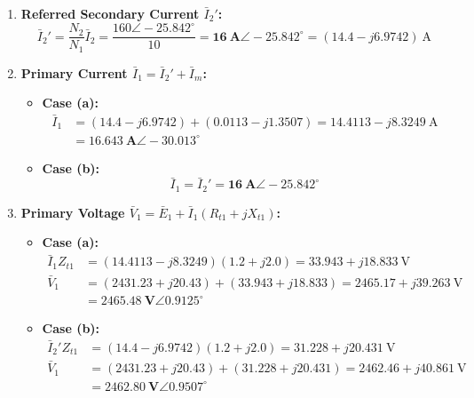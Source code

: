 \begin{enumerate}
    \item \textbf{Referred Secondary Current $\bar{I}_2'$:}
    \begin{equation}
        \bar{I}_2' = \frac{N_2}{N_1} \bar{I}_2 = \frac{160\angle -25.842^\circ}{10} = \mathbf{16\ \text{A} \angle -25.842^\circ} = (14.4 - j6.9742)\ \text{A}
    \end{equation}

    \item \textbf{Primary Current $\bar{I}_1 = \bar{I}_2' + \bar{I}_m$:}
    \begin{itemize}
        \item \textbf{Case (a):}
        \begin{align}
            \bar{I}_1 &= (14.4 - j6.9742) + (0.0113 - j1.3507) = 14.4113 - j8.3249\ \text{A} \nonumber\\
                      &= \mathbf{16.643\ \text{A} \angle -30.013^\circ}
        \end{align}
        \item \textbf{Case (b):}
        \begin{equation}
            \bar{I}_1 = \bar{I}_2' = \mathbf{16\ \text{A} \angle -25.842^\circ}
        \end{equation}
    \end{itemize}

    \item \textbf{Primary Voltage $\bar{V}_1 = \bar{E}_1 + \bar{I}_1 (R_{t1} + jX_{t1})$:}
    \begin{itemize}
        \item \textbf{Case (a):}
        \begin{align}
            \bar{I}_1 Z_{t1} &= (14.4113 - j8.3249)(1.2 + j2.0) = 33.943 + j18.833\ \text{V} \nonumber\\
            \bar{V}_1 &= (2431.23 + j20.43) + (33.943 + j18.833) = 2465.17 + j39.263\ \text{V} \nonumber\\
                      &= \boxed{\mathbf{2465.48\ \text{V} \angle 0.9125^\circ}}
        \end{align}
        \item \textbf{Case (b):}
        \begin{align}
            \bar{I}_2' Z_{t1} &= (14.4 - j6.9742)(1.2 + j2.0) = 31.228 + j20.431\ \text{V} \nonumber\\
            \bar{V}_1 &= (2431.23 + j20.43) + (31.228 + j20.431) = 2462.46 + j40.861\ \text{V} \nonumber\\
                      &= \boxed{\mathbf{2462.80\ \text{V} \angle 0.9507^\circ}}
        \end{align}
    \end{itemize}
\end{enumerate}

